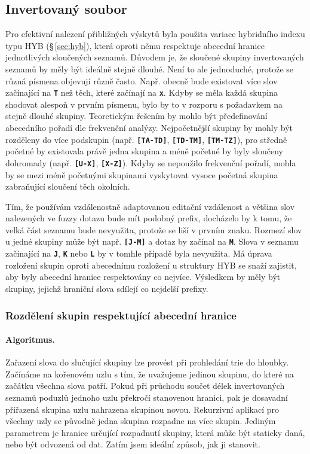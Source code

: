 \documentclass[11pt,letterpaper,oneside,openright]{book}
\newcommand{\bftt}[1]{\texttt{\textbf{#1}}}
\begin{document}
\subsection{Invertovaný soubor}
Pro efektivní nalezení přibližných výskytů byla použita variace hybridního
indexu typu HYB (\S\,\ref{sec:hyb}), která oproti němu respektuje abecední
hranice jednotlivých sloučených seznamů. Důvodem je, že sloučené skupiny
invertovaných seznamů by měly být ideálně stejně dlouhé. Není to ale
jednoduché, protože se různá písmena objevují různě často. Např. obecně bude
existovat více slov začínající na \bftt{T} než těch, které začínají na
\bftt{x}. Kdyby se měla každá skupina shodovat alespoň v prvním písmenu, bylo
by to v rozporu s požadavkem na stejně dlouhé skupiny. Teoretickým řešením by
mohlo být předefinování abecedního pořadí dle frekvenční analýzy. Nejpočetnější
skupiny by mohly být rozděleny do více podskupin (např. \bftt{[TA-TD]},
\bftt{[TD-TM]}, \bftt{[TM-TZ]}), pro středně početné by existovala právě jedna
skupina a méně početné by byly sloučeny dohromady (např. \bftt{[U-X]},
\bftt{[X-Z]}). Kdyby se nepoužilo frekvenční pořadí, mohla by se mezi méně
početnými skupinami vyskytovat vysoce početná skupina zabraňující sloučení těch
okolních.

Tím, že používám vzdálenostně adaptovanou editační vzdálenost a většina slov
nalezených ve fuzzy dotazu bude mít podobný prefix, docházelo by k tomu, že
velká část seznamu bude nevyužita, protože se liší v prvním znaku. Rozmezí slov
u jedné skupiny může být např. \bftt{[J-M]} a dotaz by začínal na \bftt{M}. Slova v
seznamu začínající na \bftt{J}, \bftt{K} nebo \bftt{L} by v tomhle případě byla
nevyužita. Má úprava rozložení skupin oproti abecednímu rozložení u struktury
HYB se snaží zajistit, aby byly abecední hranice respektovány co nejvíce.
Výsledkem by měly být skupiny, jejichž hraniční slova sdílejí co nejdelší
prefixy.

\subsubsection{Rozdělení skupin respektující abecední hranice} \label{sec:hybrid_algorithm}
\paragraph{Algoritmus.} Zařazení slova do slučující skupiny lze provést při
prohledání trie do hloubky.  Začínáme na kořenovém uzlu s tím, že uvažujeme
jedinou skupinu, do které na začátku všechna slova patří. Pokud při průchodu
součet délek invertovaných seznamů poduzlů jednoho uzlu překročí stanovenou
hranici, pak je dosavadní přiřazená skupina uzlu nahrazena skupinou novou.
Rekurzivní aplikací pro všechny uzly se původně jedna skupina rozpadne na více
skupin. Jediným parametrem je hranice určující rozpadnutí skupiny, která může
být staticky daná, nebo být odvozená od dat. Zatím jsem ideální způsob, jak ji
stanovit.
\end{document}
